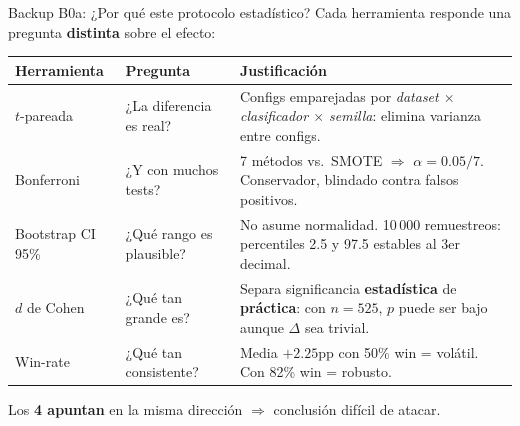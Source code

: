 


\begin{frame}{Backup B0a: ¿Por qué este protocolo estadístico?}
\scriptsize
Cada herramienta responde una pregunta \textbf{distinta} sobre el efecto:

\vspace{0.3em}
\begin{tabular}{@{}p{2.6cm}p{3.6cm}p{6.2cm}@{}}
\toprule
\textbf{Herramienta} & \textbf{Pregunta} & \textbf{Justificación} \\
\midrule
$t$-pareada       & ¿La diferencia es real?       & Configs emparejadas por \textit{dataset $\times$ clasificador $\times$ semilla}: elimina varianza entre configs. \\
\addlinespace[1pt]
Bonferroni        & ¿Y con muchos tests?          & 7 métodos vs.\ SMOTE $\Rightarrow$ $\alpha=0{.}05/7$. Conservador, blindado contra falsos positivos. \\
\addlinespace[1pt]
Bootstrap CI 95\% & ¿Qué rango es plausible?      & No asume normalidad. 10\,000 remuestreos: percentiles 2.5 y 97.5 estables al 3er decimal. \\
\addlinespace[1pt]
$d$ de Cohen      & ¿Qué tan grande es?           & Separa significancia \textbf{estadística} de \textbf{práctica}: con $n{=}525$, $p$ puede ser bajo aunque $\Delta$ sea trivial. \\
\addlinespace[1pt]
Win-rate          & ¿Qué tan consistente?         & Media $+2{.}25$pp con 50\% win = volátil. Con 82\% win = robusto. \\
\bottomrule
\end{tabular}

\vspace{0.3em}
\begin{insight}
\scriptsize Los \textbf{4 apuntan} en la misma dirección $\Rightarrow$ conclusión difícil de atacar.
\end{insight}
\end{frame}


